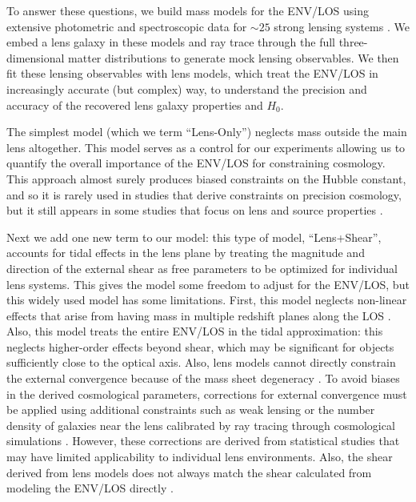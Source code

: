 \documentclass{emulateapj}
\begin{document}
To answer these questions, we build mass models for the ENV/LOS using extensive photometric and spectroscopic data for $\sim25$ strong lensing systems \citep{Momcheva06,Williams06,Momcheva15}. We embed a lens galaxy in these models and ray trace through the full three-dimensional matter distributions to generate mock lensing observables. We then fit these lensing observables with lens models, which treat the ENV/LOS in increasingly accurate (but complex) way,
to understand the precision and accuracy of the recovered lens galaxy properties and $H_0$.

The simplest model (which we term ``Lens-Only'') neglects mass outside the main lens altogether. This model serves as a control for our experiments allowing us to quantify the overall importance of the ENV/LOS for constraining cosmology. This approach almost surely produces biased constraints on the Hubble constant, and so it is rarely used in studies that derive constraints on precision cosmology, but it still appears in some studies that focus on lens and source properties \citep[e.g.,][]{Calanog14, Hezaveh13}.

Next we add one new term to our model: this type of model, ``Lens+Shear'', accounts for tidal effects in the lens plane by treating the magnitude and direction of the external shear as free parameters to be optimized for individual lens systems. This gives the model some freedom to adjust for the ENV/LOS, but this widely used model has some limitations. First, this model neglects non-linear effects that arise from having mass in multiple redshift planes along the LOS \citep[][]{McCully14,Jaroszynski12}. Also, this model treats the entire ENV/LOS in the tidal approximation: this neglects higher-order effects beyond shear, which may be significant for objects sufficiently close to the optical axis. Also, lens models cannot directly constrain the external convergence because of the mass sheet degeneracy \citep{Falco85}.  To avoid biases in the derived cosmological parameters, corrections for external convergence must be applied using additional constraints such as weak lensing \citep{Nakajima09, Fadely10} or the number density of galaxies near the lens \citep{Suyu10, Suyu13, Collett13, Greene13, Rusu16, Wong16} calibrated by ray tracing through cosmological simulations \citep[e.g.,][]{Hilbert09}. However, these corrections are derived from statistical studies that may have limited applicability to individual lens environments. Also, the shear derived from lens models does not always match the shear calculated from modeling the ENV/LOS directly \citep{Wong11}.
\end{document}
